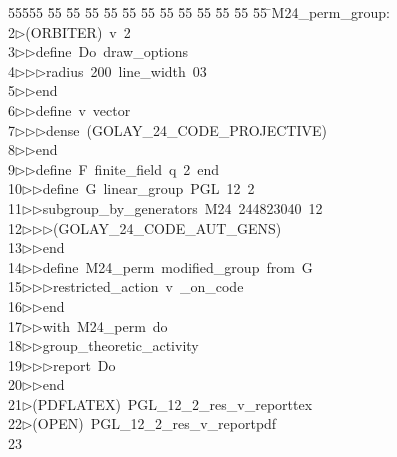 %
%
\begin{tabbing}
55555 \= 55 \= 55 \= 55 \= 55 \= 55 \= 55 \= 55 \= 55 \= 55 \= 55 \= 55 \= 55 \= \>M24\_perm\_group:\\[0pt]
2\>$\triangleright$\>(ORBITER)\ v\ 2\ \\[0pt]
3\>$\triangleright$\>$\triangleright$\>define\ Do\ draw\_options\ \\[0pt]
4\>$\triangleright$\>$\triangleright$\>$\triangleright$\>radius\ 200\ line\_width\ 03\ \\[0pt]
5\>$\triangleright$\>$\triangleright$\>end\ \\[0pt]
6\>$\triangleright$\>$\triangleright$\>define\ v\ vector\ \\[0pt]
7\>$\triangleright$\>$\triangleright$\>$\triangleright$\>dense\ (GOLAY\_24\_CODE\_PROJECTIVE)\ \\[0pt]
8\>$\triangleright$\>$\triangleright$\>end\ \\[0pt]
9\>$\triangleright$\>$\triangleright$\>define\ F\ finite\_field\ q\ 2\ end\ \\[0pt]
10\>$\triangleright$\>$\triangleright$\>define\ G\ linear\_group\ PGL\ 12\ 2\ \\[0pt]
11\>$\triangleright$\>$\triangleright$\>subgroup\_by\_generators\ M24\ 244823040\ 12\ \\[0pt]
12\>$\triangleright$\>$\triangleright$\>$\triangleright$\>(GOLAY\_24\_CODE\_AUT\_GENS)\ \\[0pt]
13\>$\triangleright$\>$\triangleright$\>end\ \\[0pt]
14\>$\triangleright$\>$\triangleright$\>define\ M24\_perm\ modified\_group\ from\ G\ \\[0pt]
15\>$\triangleright$\>$\triangleright$\>$\triangleright$\>restricted\_action\ v\ \_on\_code\ \\[0pt]
16\>$\triangleright$\>$\triangleright$\>end\ \\[0pt]
17\>$\triangleright$\>$\triangleright$\>with\ M24\_perm\ do\ \\[0pt]
18\>$\triangleright$\>$\triangleright$\>group\_theoretic\_activity\ \\[0pt]
19\>$\triangleright$\>$\triangleright$\>$\triangleright$\>report\ Do\ \\[0pt]
20\>$\triangleright$\>$\triangleright$\>end\\[0pt]
21\>$\triangleright$\>(PDFLATEX)\ PGL\_12\_2\_res\_v\_reporttex\\[0pt]
22\>$\triangleright$\>(OPEN)\ PGL\_12\_2\_res\_v\_reportpdf\\[0pt]
23\>\end{tabbing}
